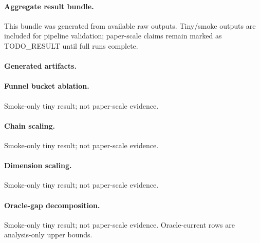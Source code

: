 \paragraph{Aggregate result bundle.}
This bundle was generated from available raw outputs. Tiny/smoke outputs are included for pipeline validation; paper-scale claims remain marked as TODO\_RESULT until full runs complete.



\paragraph{Generated artifacts.}
\paragraph{Funnel bucket ablation.}
Smoke-only tiny result; not paper-scale evidence.



\paragraph{Chain scaling.}
Smoke-only tiny result; not paper-scale evidence.



\paragraph{Dimension scaling.}
Smoke-only tiny result; not paper-scale evidence.



\paragraph{Oracle-gap decomposition.}
Smoke-only tiny result; not paper-scale evidence. Oracle-current rows are analysis-only upper bounds.






